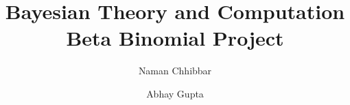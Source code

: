 \documentclass{beamer}
\title{Bayesian Theory and Computation\\Beta Binomial Project}
\author[Naman Chhibbar \\ Abhay Gupta]{
  Naman Chhibbar \and
  Abhay Gupta
}
\institute{Indian Institute of Technology Hyderabad}
\begin{document}
  \begin{frame}
    \titlepage
  \end{frame}

  
  
  
  
  
\end{document}
